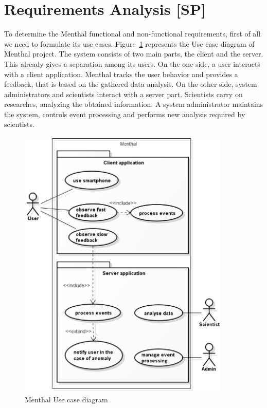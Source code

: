\section{Requirements Analysis [SP]}
To determine the Menthal functional and non-functional requirements, first of all we need to formulate its use cases.
Figure~\ref{fig:menthal_use_case_diagram} represents the Use case diagram of Menthal project.
The system consists of two main parts, the client and the server.
This already gives a separation among its users.
On the one side, a user interacts with a client application.
Menthal tracks the user behavior and provides a feedback, that is based on the gathered data analysis.
On the other side, system administrators and scientists interact with a server part.
Scientists carry on researches, analyzing the obtained information.
A system administrator maintains the system, controls event processing and performs new analysis required by scientists.

\begin{figure}[h]
  \centering
  \includegraphics [width=0.9\textwidth]{images/menthal_use_case_diagram}
  \caption{Menthal Use case diagram}
  \label{fig:menthal_use_case_diagram}
\end{figure}


